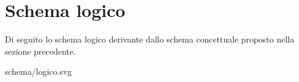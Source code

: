 \section{Schema logico}
Di seguito lo schema logico derivante dallo schema concettuale proposto nella sezione precedente.

\begin{center}
	 {schema/logico.svg}
\end{center}